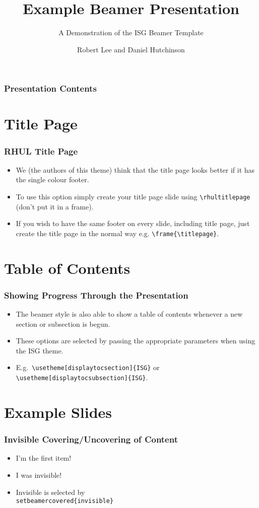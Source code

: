 \documentclass[aspectratio=169]{beamer} %
\title{Example Beamer Presentation}
\subtitle{A Demonstration of the ISG Beamer Template}
\author[R. Lee \& D. Hutchinson]{Robert Lee and Daniel Hutchinson}
\institute{Information Security Group,\\
Royal Holloway}
\begin{document}
\rhultitlepage

\begin{frame}\frametitle{Presentation Contents}
	\tableofcontents
\end{frame}

\section{Title Page}
\begin{frame}\frametitle{RHUL Title Page}
\begin{itemize}
	\item We (the authors of this theme) think that the title page looks better if it has the single colour footer.
	\item To use this option simply create your title page slide using \texttt{\textbackslash rhultitlepage} (don't put it in a frame).
	\item If you wish to have the same footer on every slide, including title page, just create the title page in the normal way e.g. \texttt{\textbackslash frame\{\textbackslash titlepage\}}.
\end{itemize}
\end{frame}

\section{Table of Contents}
\begin{frame}\frametitle{Showing Progress Through the Presentation}
\begin{itemize}
	\item The beamer style is also able to show a table of contents whenever a new section or subsection is begun.
	\item These options are selected by passing the appropriate parameters when using the ISG theme.
	\item E.g.\ \texttt{\textbackslash usetheme[displaytocsection]\{ISG\}} or \texttt{\textbackslash usetheme[displaytocsubsection]\{ISG\}}.
\end{itemize}
\end{frame}

\section{Example Slides}
\begin{frame}\frametitle{Invisible Covering/Uncovering of Content}
\begin{itemize}
	\item I'm the first item!
	\pause
	\item I was invisible!
	\pause
	\item Invisible is selected by \texttt{\\setbeamercovered\{invisible\}}
\end{itemize}
\end{frame}
\end{document}
